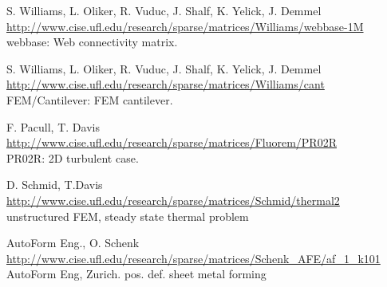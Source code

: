 	{
		{
			S. Williams, L. Oliker, R. Vuduc, J. Shalf, K. Yelick, J. Demmel 
		}
		{
			\url{http://www.cise.ufl.edu/research/sparse/matrices/Williams/webbase-1M} \\
			webbase: Web connectivity matrix.
		}
	}

	{
		{
			S. Williams, L. Oliker, R. Vuduc, J. Shalf, K. Yelick, J. Demmel 
		}
		{
			\url{http://www.cise.ufl.edu/research/sparse/matrices/Williams/cant} \\
			FEM/Cantilever: FEM cantilever.
		}
	}

	{
		{
			F. Pacull, T. Davis
		}
		{
			\url{http://www.cise.ufl.edu/research/sparse/matrices/Fluorem/PR02R} \\
			PR02R: 2D turbulent case.
		}
	}

	{
		{
			D. Schmid, T.Davis
		}
		{
			\url{http://www.cise.ufl.edu/research/sparse/matrices/Schmid/thermal2} \\
			unstructured FEM, steady state thermal problem
		}
	}

	{
		{
			AutoForm Eng., O. Schenk 
		}
		{
			\url{http://www.cise.ufl.edu/research/sparse/matrices/Schenk_AFE/af_1_k101} \\
			AutoForm Eng, Zurich. pos. def. sheet metal forming
		}
	} 
	
